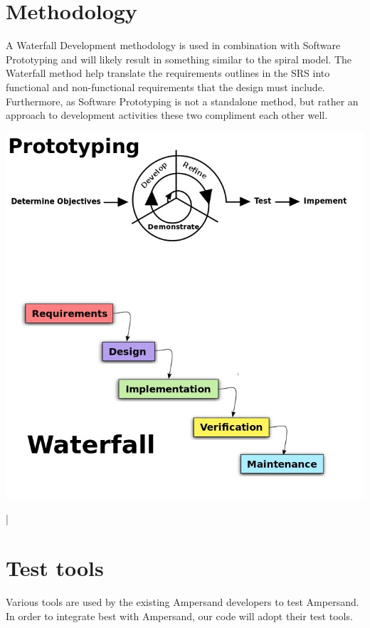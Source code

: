 \documentclass[12pt]{report}
\begin{document}
\section{Methodology}\label{sec:Methodology}
A Waterfall Development methodology is used in combination with Software 
Prototyping and will likely result in something similar to the spiral model. 
The Waterfall method help translate the requirements outlines in the SRS into 
functional and non-functional requirements that the design must include. 
Furthermore, as Software Prototyping is not a standalone method, but rather an 
approach to development activities these two compliment each other well.
\begin{center}
\includegraphics[scale=0.5]{testing}
\end{center}|
\section{Test tools}\label{sec:TestTools}

Various tools are used by the existing Ampersand developers to test
Ampersand. In order to integrate best with Ampersand, our code will adopt their
test tools. 

\end{document}
